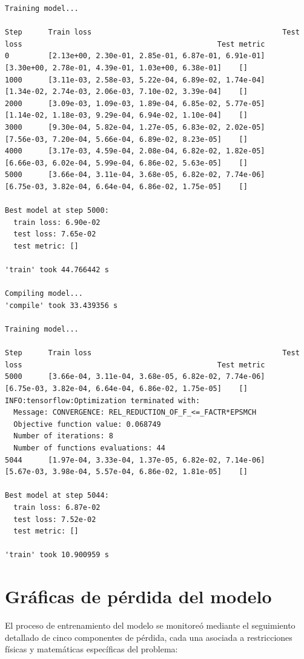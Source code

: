 \documentclass[
  spanish,
  us-letterpaper,
  DIV=11,
  numbers=noendperiod]{scrreprt}
\theoremstyle{definition}
\theoremstyle{plain}
\theoremstyle{remark}
\begin{document}
\begin{verbatim}
Training model...

Step      Train loss                                            Test loss                                             Test metric
0         [2.13e+00, 2.30e-01, 2.85e-01, 6.87e-01, 6.91e-01]    [3.30e+00, 2.78e-01, 4.39e-01, 1.03e+00, 6.38e-01]    []  
1000      [3.11e-03, 2.58e-03, 5.22e-04, 6.89e-02, 1.74e-04]    [1.34e-02, 2.74e-03, 2.06e-03, 7.10e-02, 3.39e-04]    []  
2000      [3.09e-03, 1.09e-03, 1.89e-04, 6.85e-02, 5.77e-05]    [1.14e-02, 1.18e-03, 9.29e-04, 6.94e-02, 1.10e-04]    []  
3000      [9.30e-04, 5.82e-04, 1.27e-05, 6.83e-02, 2.02e-05]    [7.56e-03, 7.20e-04, 5.66e-04, 6.89e-02, 8.23e-05]    []  
4000      [3.17e-03, 4.59e-04, 2.08e-04, 6.82e-02, 1.82e-05]    [6.66e-03, 6.02e-04, 5.99e-04, 6.86e-02, 5.63e-05]    []  
5000      [3.66e-04, 3.11e-04, 3.68e-05, 6.82e-02, 7.74e-06]    [6.75e-03, 3.82e-04, 6.64e-04, 6.86e-02, 1.75e-05]    []  

Best model at step 5000:
  train loss: 6.90e-02
  test loss: 7.65e-02
  test metric: []

'train' took 44.766442 s

Compiling model...
'compile' took 33.439356 s

Training model...

Step      Train loss                                            Test loss                                             Test metric
5000      [3.66e-04, 3.11e-04, 3.68e-05, 6.82e-02, 7.74e-06]    [6.75e-03, 3.82e-04, 6.64e-04, 6.86e-02, 1.75e-05]    []  
INFO:tensorflow:Optimization terminated with:
  Message: CONVERGENCE: REL_REDUCTION_OF_F_<=_FACTR*EPSMCH
  Objective function value: 0.068749
  Number of iterations: 8
  Number of functions evaluations: 44
5044      [1.97e-04, 3.33e-04, 1.37e-05, 6.82e-02, 7.14e-06]    [5.67e-03, 3.98e-04, 5.57e-04, 6.86e-02, 1.81e-05]    []  

Best model at step 5044:
  train loss: 6.87e-02
  test loss: 7.52e-02
  test metric: []

'train' took 10.900959 s
\end{verbatim}

\section{Gráficas de pérdida del
modelo}\label{gruxe1ficas-de-puxe9rdida-del-modelo}

El proceso de entrenamiento del modelo se monitoreó mediante el
seguimiento detallado de cinco componentes de pérdida, cada una asociada
a restricciones físicas y matemáticas específicas del problema:
\end{document}
